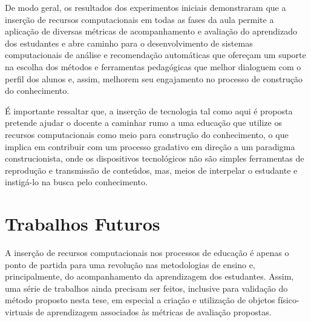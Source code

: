 
De modo geral, os resultados dos experimentos iniciais demonstraram que a inserção de recursos computacionais em todas as fases da aula permite a aplicação de diversas métricas de acompanhamento e avaliação do aprendizado dos estudantes e abre caminho para o desenvolvimento de sistemas computacionais de análise e recomendação automáticas que ofereçam um suporte na escolha dos métodos e ferramentas pedagógicas que melhor dialoguem com o perfil dos alunos e, assim, melhorem seu engajamento no processo de construção do conhecimento.

É importante ressaltar que,
a inserção de tecnologia tal como aqui é proposta pretende ajudar o docente a caminhar rumo a uma educação que utilize os recursos computacionais como meio para construção do conhecimento, o que implica em contribuir com um processo gradativo em direção a um paradigma construcionista, onde os dispositivos tecnológicos não são simples ferramentas de reprodução e transmissão de conteúdos, mas, meios de interpelar o estudante e instigá-lo na busca pelo conhecimento.

\section{Trabalhos Futuros}

A inserção de recursos computacionais nos processos de educação é apenas o ponto de partida para uma revolução nas metodologias de ensino e, principalmente, do acompanhamento da aprendizagem dos estudantes. Assim, uma série de trabalhos ainda precisam ser feitos, inclusive para validação do método proposto nesta tese, em especial a criação e utilização de objetos físico-virtuais de aprendizagem associados às métricas de avaliação propostas.

